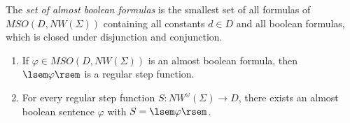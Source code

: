 \documentclass[runningheads, envcountsame, a4paper]{llncs}
\begin{document}
\begin{Def}
	The \emph{set of almost boolean formulas} is the smallest set of all formulas of $\mathit{MSO}(D, \mathit{NW}(\Sigma))$ containing all constants $d \in D$ and all boolean formulas, which is closed under disjunction and conjunction.
\end{Def}
\begin{Satz}
	\label{almboolrsf}\begin{enumerate}[\quad (a)]
	\item If $\varphi \in \mathit{MSO}(D, \mathit{NW}(\Sigma))$ is an almost boolean formula, then $\lsem \varphi \rsem$ is a regular step function.
	\item For every regular step function $S: \mathit{NW^\omega}(\Sigma)\rightarrow D$, there exists an almost boolean sentence $\varphi$ with $S=\lsem \varphi \rsem$.
	\end{enumerate}
\end{Satz}
\end{document}
